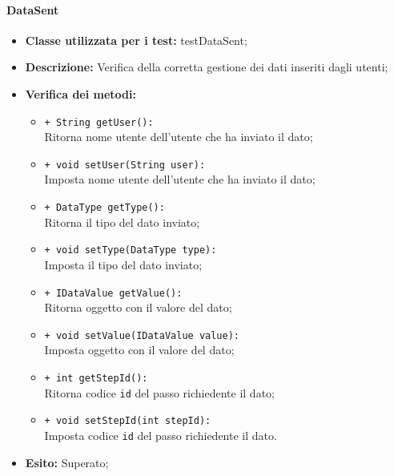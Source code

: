 \paragraph{DataSent}
\begin{flushleft}
\begin{itemize}
\item \textbf{Classe utilizzata per i test:} testDataSent;
\item \textbf{Descrizione:} Verifica della corretta gestione dei dati inseriti dagli utenti;
\item \textbf{Verifica dei metodi:}
\begin{sloppypar}
\begin{itemize}
\item \texttt{+ String getUser():}\\ Ritorna nome utente dell'utente che ha inviato il dato;
\item \texttt{+ void setUser(String user):}\\ Imposta nome utente dell'utente che ha inviato il dato;
\item \texttt{+ DataType getType():}\\ Ritorna il tipo del dato inviato;
\item \texttt{+ void setType(DataType type):}\\ Imposta il tipo del dato inviato;
\item \texttt{+ IDataValue getValue():}\\ Ritorna oggetto con il valore del dato;
\item \texttt{+ void setValue(IDataValue value):}\\ Imposta oggetto con il valore del dato;
\item \texttt{+ int getStepId():}\\ Ritorna codice \texttt{id} del passo richiedente il dato;
\item \texttt{+ void setStepId(int stepId):}\\ Imposta codice \texttt{id} del passo richiedente il dato.
\end{itemize}
\end{sloppypar}
\item \textbf{Esito:} Superato;
\end{itemize}
\end{flushleft}

